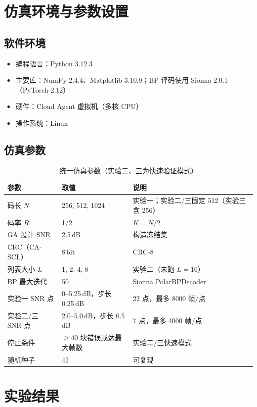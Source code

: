 \documentclass[12pt, a4paper]{article}
\begin{document}
\section{仿真环境与参数设置}
\subsection{软件环境}
\begin{itemize}
  \item 编程语言：Python 3.12.3
  \item 主要库：NumPy 2.4.4、Matplotlib 3.10.9；BP 译码使用 Sionna 2.0.1（PyTorch 2.12）
  \item 硬件：Cloud Agent 虚拟机（多核 CPU）
  \item 操作系统：Linux
\end{itemize}

\subsection{仿真参数}
\begin{table}[H]
\centering
\caption{统一仿真参数（实验二、三为快速验证模式）}
\begin{tabular}{lll}
\toprule
参数 & 取值 & 说明 \\
\midrule
码长 $N$ & 256, 512, 1024 & 实验一；实验二/三固定 512（实验三含 256） \\
码率 $R$ & 1/2 & $K=N/2$ \\
GA 设计 SNR & 2.5\,dB & 构造冻结集 \\
CRC（CA-SCL）& 8\,bit & CRC-8 \\
列表大小 $L$ & 1, 2, 4, 8 & 实验二（未跑 $L=16$） \\
BP 最大迭代 & 50 & Sionna PolarBPDecoder \\
实验一 SNR 点 & 0--5.25\,dB，步长 0.25\,dB & 22 点，最多 8000 帧/点 \\
实验二/三 SNR 点 & 2.0--5.0\,dB，步长 0.5\,dB & 7 点，最多 4000 帧/点 \\
停止条件 & $\geq 40$ 块错误或达最大帧数 & 实验二/三快速模式 \\
随机种子 & 42 & 可复现 \\
\bottomrule
\end{tabular}
\end{table}

\section{实验结果}
\end{document}
